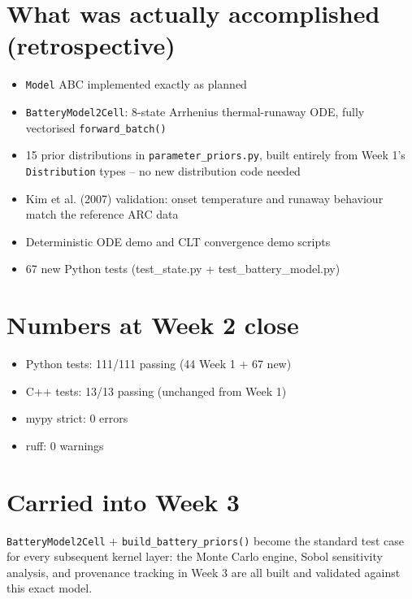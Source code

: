 \documentclass[11pt]{article}
\begin{document}
\section*{What was actually accomplished (retrospective)}

\begin{itemize}[leftmargin=*]
  \item \texttt{Model} ABC implemented exactly as planned
  \item \texttt{BatteryModel2Cell}: 8-state Arrhenius thermal-runaway
    ODE, fully vectorised \texttt{forward\_batch()}
  \item 15 prior distributions in \texttt{parameter\_priors.py}, built
    entirely from Week 1's \texttt{Distribution} types -- no new
    distribution code needed
  \item Kim et al. (2007) validation: onset temperature and runaway
    behaviour match the reference ARC data
  \item Deterministic ODE demo and CLT convergence demo scripts
  \item 67 new Python tests (test\_state.py + test\_battery\_model.py)
\end{itemize}

\section*{Numbers at Week 2 close}
\begin{itemize}[leftmargin=*]
  \item Python tests: 111/111 passing (44 Week 1 + 67 new)
  \item C++ tests: 13/13 passing (unchanged from Week 1)
  \item mypy strict: 0 errors
  \item ruff: 0 warnings
\end{itemize}

\section*{Carried into Week 3}
\texttt{BatteryModel2Cell} + \texttt{build\_battery\_priors()} become
the standard test case for every subsequent kernel layer: the Monte
Carlo engine, Sobol sensitivity analysis, and provenance tracking in
Week 3 are all built and validated against this exact model.
\end{document}
